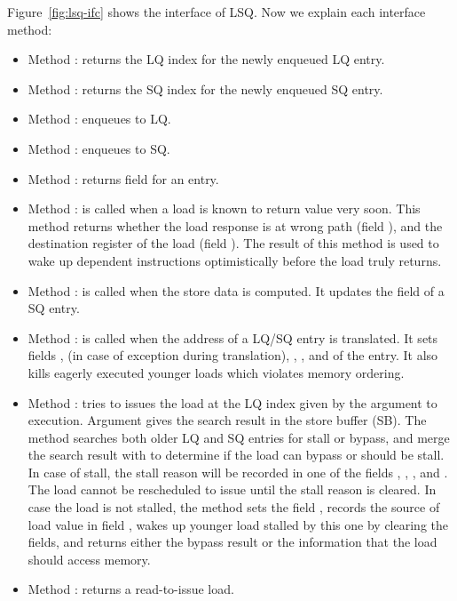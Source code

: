 Figure~\ref{fig:lsq-ifc} shows the interface of LSQ.
Now we explain each interface method:
\begin{itemize}
    \item Method : returns the LQ index for the newly enqueued LQ entry.
    \item Method : returns the SQ index for the newly enqueued SQ entry.
    \item Method : enqueues to LQ.
    \item Method : enqueues to SQ.
    \item Method : returns field  for an entry.
    \item Method : is called when a load is known to return value very soon.
    This method returns whether the load response  is at wrong path (field ), and the destination register of the load (field ).
    The result of this method is used to wake up dependent instructions optimistically before the load truly returns.
    \item Method : is called when the store data is computed.
    It updates the  field of a SQ entry.
    \item Method : is called when the address of a LQ/SQ entry is translated.
    It sets fields ,  (in case of exception during translation), , , and  of the entry.
    It also kills eagerly executed younger loads which violates memory ordering.
    \item Method : tries to issues the load at the LQ index given by the argument to execution.
    Argument  gives the search result in the store buffer (SB).
    The method searches both older LQ and SQ entries for stall or bypass, and merge the search result with  to determine if the load can bypass or should be stall.
    In case of stall, the stall reason will be recorded in one of the fields , , , and .
    The load cannot be rescheduled to issue until the stall reason is cleared.
    In case the load is not stalled, the method sets the field , records the source of load value in field , wakes up younger load stalled by this one by clearing the  fields, and returns either the bypass result or the information that the load should access memory.
    \item Method : returns a read-to-issue load.

\end{itemize}
